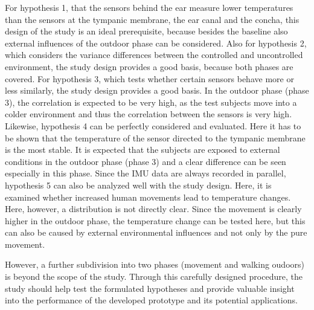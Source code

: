 For hypothesis 1, that the sensors behind the ear measure lower temperatures than the sensors at the tympanic membrane, the ear canal and the concha, this design of the study is an ideal prerequisite, because besides the baseline also external influences of the outdoor phase can be considered.
Also for hypothesis 2, which considers the variance differences between the controlled and uncontrolled environment, the study design provides a good basis, because both phases are covered.
For hypothesis 3, which tests whether certain sensors behave more or less similarly, the study design provides a good basis.
In the outdoor phase (phase 3), the correlation is expected to be very high, as the test subjects move into a colder environment and thus the correlation between the sensors is very high.
Likewise, hypothesis 4 can be perfectly considered and evaluated. 
Here it has to be shown that the temperature of the sensor directed to the tympanic membrane is the most stable. 
It is expected that the subjects are exposed to external conditions in the outdoor phase (phase 3) and a clear difference can be seen especially in this phase.
Since the IMU data are always recorded in parallel, hypothesis 5 can also be analyzed well with the study design.
Here, it is examined whether increased human movements lead to temperature changes. 
Here, however, a distribution is not directly clear. 
Since the movement is clearly higher in the outdoor phase, the temperature change can be tested here, but this can also be caused by external environmental influences and not only by the pure movement.

However, a further subdivision into two phases (movement and walking oudoors) is beyond the scope of the study.
Through this carefully designed procedure, the study should help test the formulated hypotheses and provide valuable insight into the performance of the developed prototype and its potential applications.

